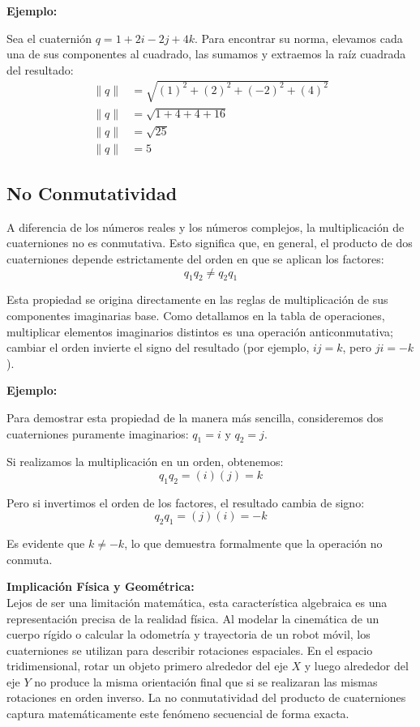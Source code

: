 \textbf{Ejemplo:}

Sea el cuaternión $q = 1 + 2i - 2j + 4k$. Para encontrar su norma, elevamos cada una de sus componentes al cuadrado, las sumamos y extraemos la raíz cuadrada del resultado:
\begin{align*}
    \lVert q \rVert &= \sqrt{(1)^2 + (2)^2 + (-2)^2 + (4)^2} \\
    \lVert q \rVert &= \sqrt{1 + 4 + 4 + 16} \\
    \lVert q \rVert &= \sqrt{25} \\
    \lVert q \rVert &= 5
\end{align*}


\subsection{No Conmutatividad}
A diferencia de los números reales y los números complejos, la multiplicación de cuaterniones no es conmutativa. Esto significa que, en general, el producto de dos cuaterniones depende estrictamente del orden en que se aplican los factores:
\begin{equation}
    q_1 q_2 \neq q_2 q_1
\end{equation}

Esta propiedad se origina directamente en las reglas de multiplicación de sus componentes imaginarias base. Como detallamos en la tabla de operaciones, multiplicar elementos imaginarios distintos es una operación anticonmutativa; cambiar el orden invierte el signo del resultado (por ejemplo, $ij = k$, pero $ji = -k$).

\textbf{Ejemplo:}

Para demostrar esta propiedad de la manera más sencilla, consideremos dos cuaterniones puramente imaginarios: $q_1 = i$ y $q_2 = j$.

Si realizamos la multiplicación en un orden, obtenemos:
\begin{equation*}
    q_1 q_2 = (i)(j) = k
\end{equation*}

Pero si invertimos el orden de los factores, el resultado cambia de signo:
\begin{equation*}
    q_2 q_1 = (j)(i) = -k
\end{equation*}

Es evidente que $k \neq -k$, lo que demuestra formalmente que la operación no conmuta. 

\textbf{Implicación Física y Geométrica:} \\
Lejos de ser una limitación matemática, esta característica algebraica es una representación precisa de la realidad física. Al modelar la cinemática de un cuerpo rígido o calcular la odometría y trayectoria de un robot móvil, los cuaterniones se utilizan para describir rotaciones espaciales. En el espacio tridimensional, rotar un objeto primero alrededor del eje $X$ y luego alrededor del eje $Y$ no produce la misma orientación final que si se realizaran las mismas rotaciones en orden inverso. La no conmutatividad del producto de cuaterniones captura matemáticamente este fenómeno secuencial de forma exacta.

